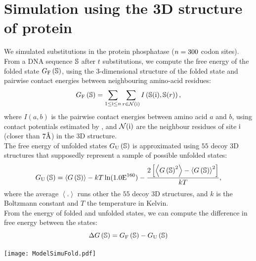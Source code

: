\section{Simulation using the 3D structure of protein}
\label{sec:simulation-using-the-3d-structure-of-protein}

We simulated substitutions in the protein phosphatase ($n=300$ codon sites).
From a \acrshort{DNA} sequence $\mathbb{S}$ after $t$ substitutions, we compute the free energy of the folded state $G_{\text{F}} \left(\mathbb{S}\right)$, using the $3$-dimensional structure of the folded state and pairwise contact energies between neighbouring amino-acid residues:
\begin{equation}
    G_{\text{F}} \left(\mathbb{S}\right) = \sum\limits_{1 \leq \text{i} \leq n} \sum\limits_{r \in \mathcal{N}(\text{i})} I \left(\mathbb{S}(\text{i}), \mathbb{S}(r) \right),
\end{equation}
where $I(a,b)$ is the pairwise contact energies between amino acid $a$ and $b$, using contact potentials estimated by \citet{Miyazawa1985}, and $\mathcal{N}(\text{i})$ are the neighbour residues of site $\text{i}$ (closer than $7\text{\normalfont\AA}$) in the 3D structure.\\
The free energy of unfolded states $G_{\text{U}} \left(\mathbb{S}\right)$ is approximated using $55$ decoy 3D structures that supposedly represent a sample of possible unfolded states:
\begin{equation}
    G_{\text{U}} \left(\mathbb{S}\right) = \left\langle G\left(\mathbb{S}\right) \right\rangle - kT \ln (1.0\text{E}^{160}) - \frac{2 \left[ \left\langle G\left(\mathbb{S}\right)^2 \right\rangle - \left\langle G\left(\mathbb{S}\right) \right\rangle^2\right] }{kT},
\end{equation}
where the average $\left\langle . \right\rangle$ runs other the $55$ decoy 3D structures, and $k$ is the Boltzmann constant and $T$ the temperature in Kelvin.\\
From the energy of folded and unfolded states, we can compute the difference in free energy between the states:
\begin{equation}
    \Delta G\left(\mathbb{S}\right) = G_{\text{F}} \left(\mathbb{S}\right) - G_{\text{U}} \left(\mathbb{S}\right)
\end{equation}
\begin{center}
    \texttt{[image: ModelSimuFold.pdf]}
\end{center}

